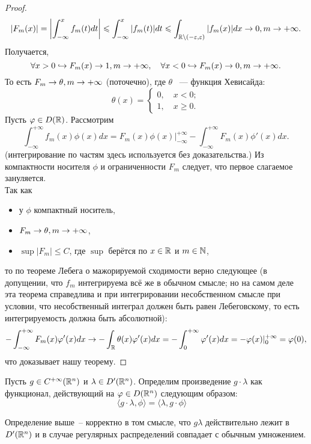 \begin{proof}
    \[
        |F_m(x)| = \left|\int_{-\infty}^x f_m(t)dt\right| \leqslant \int_{-\infty}^x |f_m(t)|dt \leqslant \int_{\mathbb{R} \setminus (-\varepsilon, \varepsilon)} |f_m(x)|dx \rightarrow 0, m \rightarrow +\infty.
    \]
    Получается,
    \[
        \forall x > 0 \hookrightarrow F_m(x) \rightarrow 1, m \rightarrow +\infty, \quad \forall x < 0 \hookrightarrow F_m(x) \rightarrow 0, m \rightarrow +\infty.
    \]
    То есть $F_m \rightarrow \theta, m \rightarrow +\infty$ (поточечно), где $\theta$ ~--- функция Хевисайда:
    \[
        \theta(x) = \begin{cases}
                        0,\quad x < 0; \\
                        1,\quad x \geq 0.
        \end{cases}
    \]
    Пусть $\varphi \in D(\mathbb{R})$. Рассмотрим
    \[
        \int_{-\infty}^{+\infty} f_m(x)\phi(x)dx = F_m(x)\phi(x)\bigg|^{+\infty}_{-\infty} - \int_{-\infty}^{+\infty} F_m(x)\phi'(x)dx.
    \]
    (интегрирование по частям здесь используется без доказательства.)
    Из компактности носителя $\phi$ и ограниченности $F_m$ следует, что первое слагаемое зануляется.\\
    Так как
    \begin{itemize}
        \item у $\phi$ компактный носитель,
        \item $F_m \rightarrow \theta, m \rightarrow +\infty$,
        \item $\sup |F_m| \leq C$, где $\sup$ берётся по $x\in \mathbb{R}$ и $m \in \mathbb{N}$,
    \end{itemize}
    то по теореме Лебега о мажорируемой сходимости верно следующее (в допущении, что $f_m$ интегрируема всё же в обычном смысле; но на самом деле эта теорема справедлива и при интегрировании несобственном смысле при условии, что несобственный интеграл должен быть равен Лебеговскому, то есть интегрируемость должна быть абсолютной):
    \[
        -\int_{-\infty}^{+\infty} F_m(x)\varphi'(x)dx \rightarrow -\int_{\mathbb{R}} \theta(x)\varphi'(x)dx = -\int_0^{+\infty} \varphi'(x)dx = -\varphi(x)|^{+\infty}_0 = \varphi(0),
    \]
    что доказывает нашу теорему.
\end{proof}
\begin{definition}
    Пусть $g \in C^{+\infty}(\mathbb{R}^n)$ и $\lambda \in D'(\mathbb{R}^n)$.
    Определим произведение $g\cdot\lambda$ как функционал, действующий на $\varphi \in D(\mathbb{R}^n)$ следующим образом:
    \[
        \langle g \cdot \lambda, \phi \rangle = \langle \lambda, g \cdot \phi \rangle \quad \tag{$\ast$}
    \]
\end{definition}
\begin{theorem}
    Определение выше~-- корректно в том смысле, что $g\lambda$ действительно лежит в $D'(\mathbb{R}^n)$ и в случае регулярных распределений совпадает с обычным умножением.
\end{theorem}
